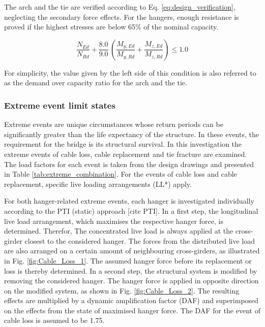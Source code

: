 

The arch and the tie are verified according to Eq. \eqref{eq:design_verification}, neglecting the secondary force effects. For the hangers, enough resistance is proved if the highest stresses are below 65\% of the nominal capacity. 

\begin{equation}
    \frac{N_{Ed}}{N_{Rd}} + \frac{8.0}{9.0}\, \left(\frac{M_{y,Ed}}{M_{y,Rd}}+\frac{M_{z,Ed}}{M_{z,Rd}} \right) \leq 1.0
    \label{eq:design_verification}
\end{equation}

For simplicity, the value given by the left side of this condition is also referred to as the demand over capacity ratio for the arch and the tie.

\subsubsection{Extreme event limit states}
Extreme events are unique circumstances whose return periods can be significantly greater than the life expectancy of the structure. In these events, the requirement for the bridge is its structural survival. In this investigation the extreme events of cable loss, cable replacement and tie fracture are examined. The load factors for each event is taken from the design drawings and presented in Table \ref{tab:extreme_combination}. For the events of cable loss and cable replacement, specific live loading arrangements (LL*) apply.



For both hanger-related extreme events, each hanger is investigated individually according to the PTI (static) approach [cite PTI]. In a first step, the longitudinal live load arrangement, which maximises the respective hanger force, is determined. Therefor, The concentrated live load is always applied at the cross-girder closest to the considered hanger. The forces from the distributed live load are also arranged on a certain amount of neighbouring cross-girders, as illustrated in Fig. \ref{fig:Cable_Loss_1}. The assumed hanger force before its replacement or loss is thereby determined. In a second step, the structural system is modified by removing the considered hanger. The hanger force is applied in opposite direction on the modified system, as shown in Fig. \ref{fig:Cable_Loss_2}. The resulting effects are multiplied by a dynamic amplification factor (DAF) and superimposed on the effects from the state of maximised hanger force. The DAF for the event of cable loss is assumed to be 1.75.\\

